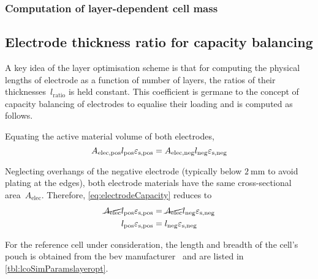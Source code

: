 \subsubsection*{\hypertarget{href:layerdependentcellmass}{Computation of layer-dependent cell mass}}\label{sec:massofonecell}

\subsection{Electrode thickness ratio for capacity balancing}\label{sec:electroderatio}

A key  idea of the layer  optimisation scheme is that  for computing the
physical  lengths  of electrode  as  a  function  of number  of  layers,
the  ratios  of  their thicknesses~$l_\text{ratio}$  is  held  constant.
This  coefficient is  germane to  the concept  of capacity  balancing of
electrodes  to equalise  their loading and is computed as follows.

Equating  the active material volume of both electrodes,
\begin{equation}
    A_\text{elec,pos}l_\text{pos}  \varepsilon_\text{s,pos} = A_\text{elec,neg}l_\text{neg}  \varepsilon_\text{s,neg} \label{eq:electrodeCapacity}\\
\end{equation}

Neglecting  overhangs   of  the  negative  electrode   (typically  below
$\SI{2}{\milli\meter}$ to  avoid plating  at the edges),  both electrode
materials have the same cross-sectional area~$A_\text{elec}$. Therefore,
\cref{eq:electrodeCapacity} reduces to
\begin{align}
    \cancel{A_\text{elec}}l_\text{pos}  \varepsilon_\text{s,pos} & = \cancel{A_\text{elec}}l_\text{neg}  \varepsilon_\text{s,neg}  \\
    l_\text{pos}  \varepsilon_\text{s,pos}                       & = l_\text{neg}  \varepsilon_\text{s,neg}\label{eq:electrodeCapequalarea}
\end{align}

For the reference cell under consideration, the length and breadth of the cell's
pouch is  obtained from the \gls{bev}  manufacturer~\cite{GMBoltBatteryDims} and
are listed in \cref{tbl:lcoSimParamslayeropt}.




